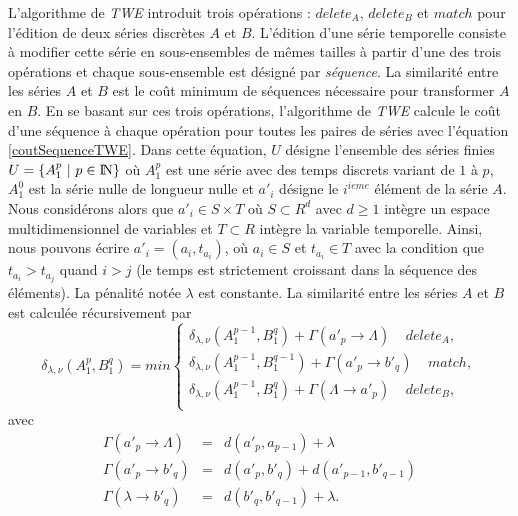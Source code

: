 L'algorithme de {\em TWE} introduit trois op\'erations : $delete_A$, $delete_B$ et $match$ pour l'\'edition de deux s\'eries discr\`etes $A$ et $B$. L'\'edition d'une s\'erie temporelle consiste \`a modifier cette s\'erie en sous-ensembles de m\^emes tailles \`a partir d'une des trois op\'erations et chaque sous-ensemble est d\'esign\'e par  {\em s\'equence}. La similarit\'e entre les s\'eries $A$ et $B$ est le co\^ut minimum de s\'equences n\'ecessaire pour transformer $A$ en $B$.
En se basant sur ces trois op\'erations, l'algorithme de {\em TWE} calcule le co\^ut d'une s\'equence \`a chaque op\'eration pour toutes les paires de s\'eries avec l'\'equation \ref{coutSequenceTWE}. Dans cette \'equation, $U$ d\'esigne l'ensemble des s\'eries finies $U = \{A_1^p ~|~ p\in \mbox{I\hspace{-.15em}N} \}$ o\`u $A_1^p$ est une s\'erie avec des temps discrets variant de $1$ \`a $p$,
 $A_1^0$ est la s\'erie nulle de longueur nulle et 
 $a'_i$ d\'esigne le $i^{ieme}$ \'el\'ement de la s\'erie $A$.
Nous consid\'erons alors que $a'_i \in S \times T$ o\`u $S \subset R^d$ avec $d \ge 1$ int\`egre un espace multidimensionnel de variables et $T \subset R$  int\`egre la variable temporelle.
Ainsi, nous pouvons \'ecrire $a'_i = (a_i, t_{a_i})$, o\`u $a_i \in S$ et $t_{a_i} \in T$ avec la condition que  $t_{a_i} > t_{a_j}$ quand $i > j$ (le temps est strictement croissant dans la s\'equence des \'el\'ements).
La p\'enalit\'e not\'ee $\lambda$ est constante.
La similarit\'e entre les s\'eries $A$ et $B$ est calcul\'ee r\'ecursivement par 
\begin{equation}
	\delta_{\lambda,\nu}(A_1^p, B_1^q) = min
	\begin{cases}
		\delta_{\lambda,\nu}(A_1^{p-1}, B_1^q) + \Gamma(a'_p \rightarrow \Lambda) ~~~~~ delete_A, \\
		 \delta_{\lambda,\nu}(A_1^{p-1}, B_1^{q-1}) + \Gamma(a'_p \rightarrow b'_q) ~~~~~ match, \\
		 \delta_{\lambda,\nu}(A_1^{p-1}, B_1^q) + \Gamma(\Lambda \rightarrow a'_p) ~~~~~ delete_B, \\
	\end{cases}
	\label{coutSequenceTWE}
\end{equation} 
avec 
 \[
	\begin{array}{lcl} 
	\Gamma(a'_p \rightarrow \Lambda) & = & d(a'_p, a_{p-1}) + \lambda  \\ 
	\Gamma(a'_p \rightarrow b'_q) & = & d(a'_p, b'_{q}) + d(a'_{p-1}, b'_{q-1}) \\
	\Gamma(\lambda \rightarrow b'_q)  & = & d(b'_q, b'_{q-1}) + \lambda. 
	\end{array}
\]
